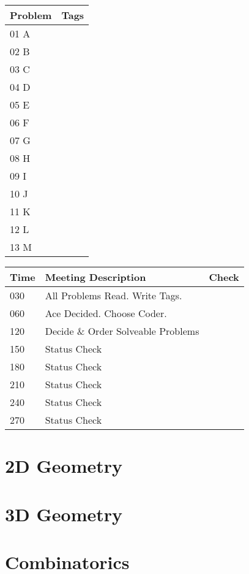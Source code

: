 \documentclass[twocolumn]{article}
\begin{document}
	\tableofcontents
	\newpage
	\begin{tabular}{| l || m{7cm} | }
		\hline
		\textbf{Problem} & \textbf{Tags}\\	\hline
		01 A & \\	\hline
		02 B & \\	\hline
		03 C & \\	\hline
		04 D & \\	\hline
		05 E & \\	\hline
		06 F & \\	\hline
		07 G & \\	\hline
		08 H & \\	\hline
		09 I & \\	\hline
		10 J & \\	\hline
		11 K & \\	\hline
		12 L & \\	\hline
		13 M & \\	\hline
	\end{tabular}

	\begin{tabular}{| l | l || m{12mm}| }
		\hline
		\textbf{Time} & \textbf{Meeting Description} & \textbf{Check} \\	\hline
		030 & All Problems Read. Write Tags. & 	\\	\hline
		060 & Ace Decided. Choose Coder.	&	\\	\hline
		120 & Decide \& Order Solveable Problems &	\\	\hline
		150 & Status Check &	\\	\hline
		180 & Status Check &	\\	\hline
		210 & Status Check &	\\	\hline
		240 & Status Check &	\\	\hline
		270 & Status Check &	\\	\hline
	\end{tabular}
	\newpage

	\section{2D Geometry}
		
		
	\section{3D Geometry}
	\section{Combinatorics}
		
\end{document}
